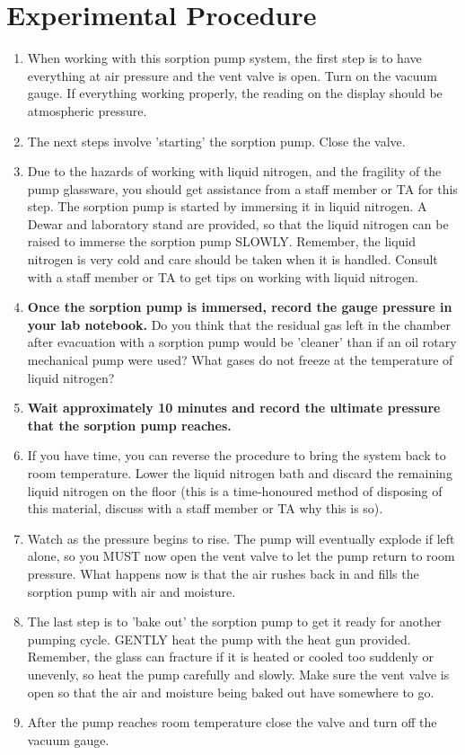\section{Experimental Procedure}
\begin{enumerate}
\item When working with this sorption pump system, the first step is to have everything at air pressure and the vent valve is open. Turn on the vacuum gauge. If everything working properly, the reading on the display should be atmospheric pressure.

\item The next steps involve 'starting' the sorption pump. Close the valve.

\item Due to the hazards of working with liquid nitrogen, and the fragility of the pump glassware, you should get assistance from a staff member or TA for this step. The sorption pump is started by immersing it in liquid nitrogen. A Dewar and laboratory stand are provided, so that the liquid nitrogen can be raised to immerse the sorption pump SLOWLY. Remember, the liquid nitrogen is very cold and care should be taken when it is handled. Consult with a staff member or TA to get tips on working with liquid nitrogen.

\item {\bf Once the sorption pump is immersed, record the gauge pressure in your lab notebook.} Do you think that the residual gas left in the chamber after evacuation with a sorption pump would be 'cleaner' than if an oil rotary mechanical pump were used? What gases do not freeze at the temperature of liquid nitrogen?

\item {\bf Wait approximately 10 minutes and record the ultimate pressure that the sorption pump reaches.}

\item If you have time, you can reverse the procedure to bring the system back to room temperature. Lower the liquid nitrogen bath and discard the remaining liquid nitrogen on the floor (this is a time-honoured method of disposing of this material, discuss with a staff member or TA why this is so).

\item Watch as the pressure begins to rise. The pump will eventually explode if left alone, so you MUST now open the vent valve to let the pump return to room pressure. What happens now is that the air rushes back in and fills the sorption pump with air and moisture.

\item The last step is to 'bake out' the sorption pump to get it ready for another pumping cycle. GENTLY heat the pump with the heat gun provided. Remember, the glass can fracture if it is heated or cooled too suddenly or unevenly, so heat the pump carefully and slowly. Make sure the vent valve is open so that the air and moisture being baked out have somewhere to go.

\item After the pump reaches room temperature close the valve and turn off the vacuum gauge.

\end{enumerate}

